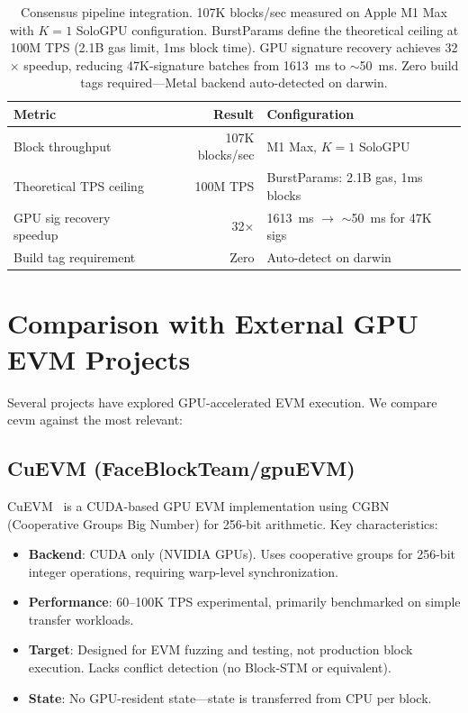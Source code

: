 \documentclass[11pt]{article}
\begin{document}
\begin{table}[h]
\centering
\small
\begin{tabular}{lrl}
\toprule
\textbf{Metric} & \textbf{Result} & \textbf{Configuration} \\
\midrule
Block throughput         & 107K blocks/sec     & M1 Max, $K{=}1$ SoloGPU \\
Theoretical TPS ceiling  & 100M TPS            & BurstParams: 2.1B gas, 1ms blocks \\
GPU sig recovery speedup & 32$\times$          & \SI{1613}{ms} $\to$ $\sim$\SI{50}{ms} for 47K sigs \\
Build tag requirement    & Zero                & Auto-detect on darwin \\
\bottomrule
\end{tabular}
\caption{Consensus pipeline integration. 107K blocks/sec measured on Apple M1 Max
with $K{=}1$ SoloGPU configuration. BurstParams define the theoretical ceiling at
100M TPS (2.1B gas limit, 1ms block time). GPU signature recovery achieves
32$\times$ speedup, reducing 47K-signature batches from \SI{1613}{ms} to
$\sim$\SI{50}{ms}. Zero build tags required---Metal backend auto-detected on darwin.}
\label{tab:consensus}
\end{table}

\section{Comparison with External GPU EVM Projects}
\label{sec:comparison}

Several projects have explored GPU-accelerated EVM execution. We compare cevm against
the most relevant:

\subsection{CuEVM (FaceBlockTeam/gpuEVM)}

CuEVM~\cite{cuevm} is a CUDA-based GPU EVM implementation using CGBN (Cooperative Groups
Big Number) for 256-bit arithmetic. Key characteristics:

\begin{itemize}
\item \textbf{Backend}: CUDA only (NVIDIA GPUs). Uses cooperative groups for 256-bit
      integer operations, requiring warp-level synchronization.
\item \textbf{Performance}: 60--100K TPS experimental, primarily benchmarked on simple
      transfer workloads.
\item \textbf{Target}: Designed for EVM fuzzing and testing, not production block execution.
      Lacks conflict detection (no Block-STM or equivalent).
\item \textbf{State}: No GPU-resident state---state is transferred from CPU per block.
\end{itemize}
\end{document}
